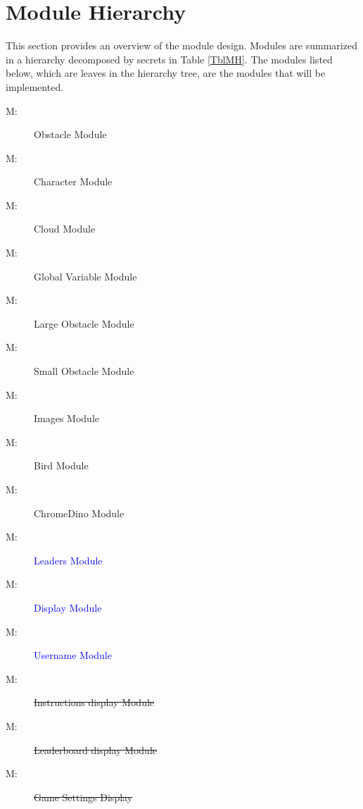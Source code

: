 \documentclass[12pt, titlepage]{article}
\newcounter{mnum}
\newcommand{\mthemnum}{M\themnum}
\begin{document}
\section{Module Hierarchy} \label{SecMH}

This section provides an overview of the module design. Modules are summarized
in a hierarchy decomposed by secrets in Table \ref{TblMH}. The modules listed
below, which are leaves in the hierarchy tree, are the modules that will be implemented.

\begin{description}
\item [ \mthemnum \label{mHH}:] Obstacle Module
\item [ \mthemnum \label{mHH}:] Character Module 
\item [ \mthemnum \label{mHH}:] Cloud Module 
\item [ \mthemnum \label{mHH}:] Global Variable Module 
\item [ \mthemnum \label{mHH}:] Large Obstacle Module
\item [ \mthemnum \label{mHH}:] Small Obstacle Module
\item [ \mthemnum \label{mHH}:] Images Module
\item [ \mthemnum \label{mHH}:] Bird Module
\item [ \mthemnum \label{mHH}:] ChromeDino Module
\item [ \mthemnum \label{mHH}:] \textcolor{blue}{Leaders Module}
\item [ \mthemnum \label{mHH}:] \textcolor{blue}{Display Module }
\item [ \mthemnum \label{mHH}:] \textcolor{blue}{Username Module} 

\item [ \mthemnum \label{mHH}:] \sout{Instructions display Module}
\item [ \mthemnum \label{mHH}:] \sout{Leaderboard display Module}
\item [ \mthemnum \label{mHH}:] \sout{Game Settings Display}


\end{description}
\end{document}
